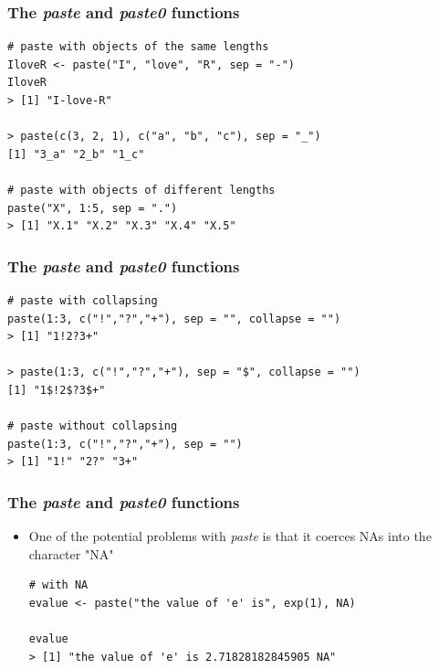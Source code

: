 \documentclass[xcolor=dvipsnames, xcolor=table]{beamer} %
\theoremstyle{mystyle}
\begin{document}
\begin{frame}[fragile]
\frametitle{The \textit{paste} and \textit{paste0} functions}

\begin{verbatim}
# paste with objects of the same lengths
IloveR <- paste("I", "love", "R", sep = "-")
IloveR
> [1] "I-love-R"

> paste(c(3, 2, 1), c("a", "b", "c"), sep = "_")
[1] "3_a" "2_b" "1_c"

# paste with objects of different lengths
paste("X", 1:5, sep = ".")
> [1] "X.1" "X.2" "X.3" "X.4" "X.5"
\end{verbatim}

\end{frame}

\begin{frame}[fragile]
\frametitle{The \textit{paste} and \textit{paste0} functions}

\begin{verbatim}
# paste with collapsing
paste(1:3, c("!","?","+"), sep = "", collapse = "")
> [1] "1!2?3+"

> paste(1:3, c("!","?","+"), sep = "$", collapse = "")
[1] "1$!2$?3$+"

# paste without collapsing
paste(1:3, c("!","?","+"), sep = "")
> [1] "1!" "2?" "3+"

\end{verbatim}

\end{frame}


\begin{frame}[fragile]
\frametitle{The \textit{paste} and \textit{paste0} functions}

\begin{itemize}
\item One of the potential problems with \textit{paste} is that it coerces NAs into the character "NA"

\begin{verbatim}
# with NA
evalue <- paste("the value of 'e' is", exp(1), NA)

evalue
> [1] "the value of 'e' is 2.71828182845905 NA"
\end{verbatim}
\end{itemize}

\end{frame}
\end{document}
